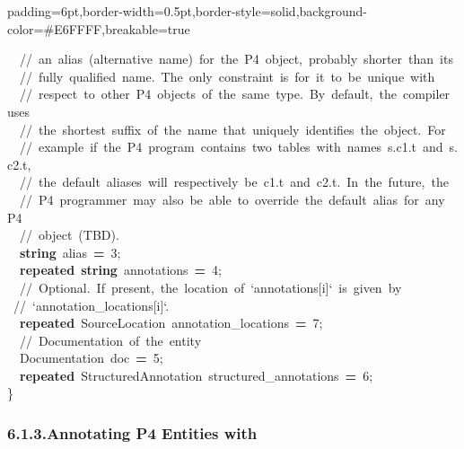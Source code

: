 \documentclass[11pt]{article}
\begin{document}
{\begin{mdbmargintb}{6pt}{6pt}
\begin{mdblock}{padding=6pt,border-width=0.5pt,border-style=solid,background-color=\#E6FFFF,breakable=true}
\begin{mdpre}
{{~~{//~an~alias~(alternative~name)~for~the~P4~object,~probably~shorter~than~its}\\
~~{//~fully~qualified~name.~The~only~constraint~is~for~it~to~be~unique~with}\\
~~{//~respect~to~other~P4~objects~of~the~same~type.~By~default,~the~compiler~uses}\\
~~{//~the~shortest~suffix~of~the~name~that~uniquely~identifies~the~object.~For}\\
~~{//~example~if~the~P4~program~contains~two~tables~with~names~s.c1.t~and~s.c2.t,}\\
~~{//~the~default~aliases~will~respectively~be~c1.t~and~c2.t.~In~the~future,~the}\\
~~{//~P4~programmer~may~also~be~able~to~override~the~default~alias~for~any~P4}\\
~~{//~object~(TBD).}\\
~~{\bfseries{string}}~alias~{\bfseries{=}}~{3};\\
~~{\bfseries{repeated}}~{\bfseries{string}}~annotations~{\bfseries{=}}~{4};\\
~~{//~Optional.~If~present,~the~location~of~`annotations{}[i]`~is~given~by}\\
~{//~`annotation\_locations{}[i]`.}\\
~~{\bfseries{repeated}}~SourceLocation~annotation\_locations~{\bfseries{=}}~{7};\\
~~{//~Documentation~of~the~entity}\\
~~Documentation~doc~{\bfseries{=}}~{5};\\
~~{\bfseries{repeated}}~StructuredAnnotation~structured\_annotations~{\bfseries{=}}~{6};\\
\}}}%
\end{mdpre}%
\end{mdblock}%
\end{mdbmargintb}%

\subsubsection{6.1.3.\hspace*{0.5em}Annotating P4 Entities with }\label{sec-annotating-p4-entities-with-documentation}%

}
\end{document}
